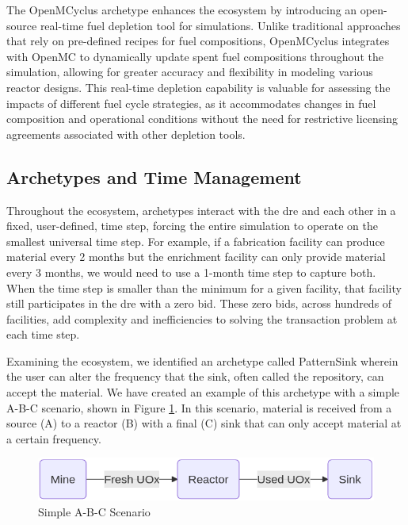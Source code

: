 The OpenMCyclus archetype \cite{openmcyclus_paper} enhances the \cyclus
ecosystem by introducing an open-source real-time fuel depletion tool for
\cyclus simulations. Unlike traditional approaches that rely on pre-defined
recipes for fuel compositions, OpenMCyclus integrates with OpenMC
\cite{romano_openmc_2015} to dynamically update spent fuel compositions
throughout the simulation, allowing for greater accuracy and flexibility in
modeling various reactor designs. This real-time depletion capability is
valuable for assessing the impacts of different fuel cycle strategies, as it
accommodates changes in fuel composition and operational conditions without the
need for restrictive licensing agreements associated with other depletion tools.

\subsection{Archetypes and Time Management}
\label{sec:archetypes_and_time_management}

Throughout the \cyclus ecosystem, archetypes interact with the \gls{dre} and
each other in a fixed, user-defined, time step, forcing the entire simulation
to operate on the smallest universal time step. For example, if a fabrication
facility can produce material every 2 months but the enrichment facility can
only provide material every 3 months, we would need to use a 1-month time step
to capture both. When the time step is smaller than the minimum for a given
facility, that facility still participates in the \gls{dre} with a zero bid.
These zero bids, across hundreds of facilities, add complexity and
inefficiencies to solving the transaction problem at each time step.

Examining the \cyclus ecosystem, we identified an archetype called PatternSink
wherein the user can alter the frequency that the sink, often called
the repository, can accept the material. We have created an example of this
archetype with a simple A-B-C scenario, shown in Figure \ref{fig:a-b-c}. In
this scenario, material is received from a source (A) to a reactor (B) with a
final (C) sink that can only accept material at a certain frequency.

\begin{figure}[H]
    \centering
    \includegraphics[scale=0.4]{images/cyclus/a-b-c.png}
    \caption{Simple A-B-C Scenario}
    \label{fig:a-b-c}
\end{figure}

